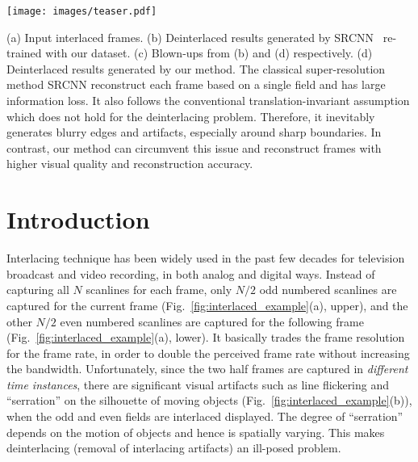 \documentclass[acmtog]{acmart}
\begin{document}




\begin{teaserfigure}
  \texttt{[image: images/teaser.pdf]}
  \caption{(a) Input interlaced frames. (b) Deinterlaced results generated by SRCNN~\cite{dong2016image} re-trained with our dataset. (c) Blown-ups from (b) and (d) respectively. (d) Deinterlaced results generated by our method. The classical super-resolution method SRCNN reconstruct each frame based on a single field and has large information loss. It also follows the conventional translation-invariant assumption which does not hold for the deinterlacing problem. Therefore, it inevitably generates blurry edges and artifacts, especially around sharp boundaries. In contrast, our method can circumvent this issue and reconstruct frames with higher visual quality and reconstruction accuracy.}
  \label{fig:teaser}
\end{teaserfigure}

\maketitle

\section{Introduction}

Interlacing technique has been widely used in the past few decades for television
broadcast and video recording, in both analog and digital ways. Instead of capturing all
$N$ scanlines for each frame, only $N/2$ odd numbered scanlines are captured for
the current frame (Fig.~\ref{fig:interlaced_example}(a), upper), and the other
$N/2$ even numbered scanlines are captured for the following frame
(Fig.~\ref{fig:interlaced_example}(a), lower). It basically trades the frame
resolution for the frame rate, in order to double the perceived frame rate
without increasing the bandwidth. Unfortunately, since the two half frames are
captured in {\em different time instances}, there are significant visual
artifacts such as line flickering and ``serration'' on the silhouette of moving
objects (Fig.~\ref{fig:interlaced_example}(b)), when the odd and even fields are
interlaced displayed. The degree of ``serration'' depends on the motion of objects
and hence is spatially varying. This makes deinterlacing (removal of interlacing artifacts) an ill-posed problem.
\end{document}
